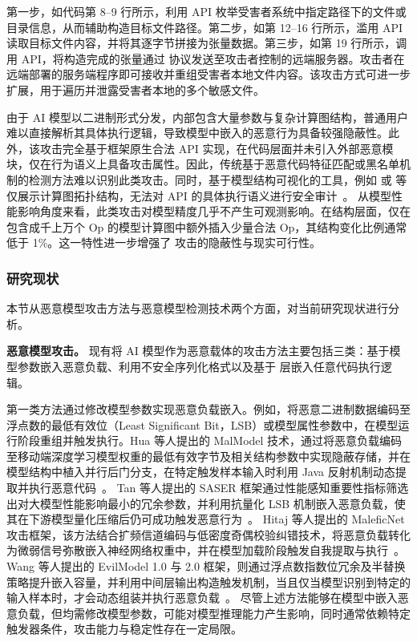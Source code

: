 第一步，如代码第 8--9 行所示，利用  API 枚举受害者系统中指定路径下的文件或目录信息，从而辅助构造目标文件路径。第二步，如第 12--16 行所示，滥用  API 读取目标文件内容，并将其逐字节拼接为张量数据。第三步，如第 19 行所示，调用  API，将构造完成的张量通过  协议发送至攻击者控制的远端服务器。攻击者在远端部署的服务端程序即可接收并重组受害者本地文件内容。该攻击方式可进一步扩展，用于遍历并泄露受害者本地的多个敏感文件。

由于 AI 模型以二进制形式分发，内部包含大量参数与复杂计算图结构，普通用户难以直接解析其具体执行逻辑，导致模型中嵌入的恶意行为具备较强隐蔽性。此外，该攻击完全基于框架原生合法 API 实现，在代码层面并未引入外部恶意模块，仅在行为语义上具备攻击属性。因此，传统基于恶意代码特征匹配或黑名单机制的检测方法难以识别此类攻击。同时，基于模型结构可视化的工具，例如  或  等仅展示计算图拓扑结构，无法对 API 的具体执行语义进行安全审计~\cite{tensorboard,netron}。
从模型性能影响角度来看，此类攻击对模型精度几乎不产生可观测影响。在结构层面，仅在包含成千上万个 Op 的模型计算图中额外插入少量合法 Op，其结构变化比例通常低于 1\%。这一特性进一步增强了  攻击的隐蔽性与现实可行性。

\subsubsection{研究现状}
本节从恶意模型攻击方法与恶意模型检测技术两个方面，对当前研究现状进行分析。

\textbf{恶意模型攻击。}
现有将 AI 模型作为恶意载体的攻击方法主要包括三类：基于模型参数嵌入恶意负载、利用不安全序列化格式以及基于  层嵌入任意代码执行逻辑。

第一类方法通过修改模型参数实现恶意负载嵌入。例如，将恶意二进制数据编码至浮点数的最低有效位（Least Significant Bit，LSB）或模型属性参数中，在模型运行阶段重组并触发执行。Hua 等人提出的 MalModel 技术，通过将恶意负载编码至移动端深度学习模型权重的最低有效字节及相关结构参数中实现隐蔽存储，并在模型结构中植入并行后门分支，在特定触发样本输入时利用 Java 反射机制动态提取并执行恶意代码~\cite{hua2024malmodel}。
Tan 等人提出的 SASER 框架通过性能感知重要性指标筛选出对大模型性能影响最小的冗余参数，并利用抗量化 LSB 机制嵌入恶意负载，使其在下游模型量化压缩后仍可成功触发恶意行为~\cite{tan2025saser}。
Hitaj 等人提出的 MaleficNet 攻击框架，该方法结合扩频信道编码与低密度奇偶校验纠错技术，将恶意负载转化为微弱信号弥散嵌入神经网络权重中，并在模型加载阶段触发自我提取与执行~\cite{hitaj2024trust}。
Wang 等人提出的 EvilModel 1.0 与 2.0 框架，则通过浮点数指数位冗余及半替换策略提升嵌入容量，并利用中间层输出构造触发机制，当且仅当模型识别到特定的输入样本时，才会动态组装并执行恶意负载~\cite{wang2021evilmodel,wang2022evilmodel}。
尽管上述方法能够在模型中嵌入恶意负载，但均需修改模型参数，可能对模型推理能力产生影响，同时通常依赖特定触发器条件，攻击能力与稳定性存在一定局限。

